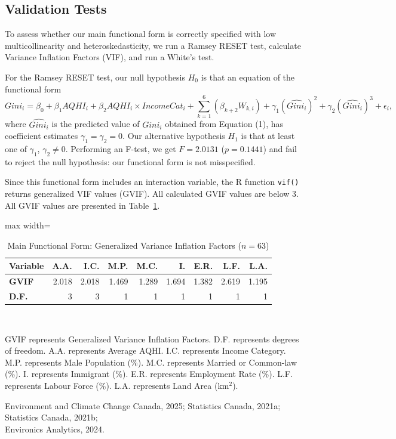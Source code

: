 \documentclass[AEJ]{AEA}
\begin{document}
\subsection{Validation Tests}

To assess whether our main functional form is correctly specified with low multicollinearity
and heteroskedasticity, we run a Ramsey RESET test, calculate Variance Inflation Factors (VIF), 
and run a White's test.

For the Ramsey RESET test, our null hypothesis $H_0$ is that an equation of
the functional form
\begin{equation}
Gini_i=\beta_0+\beta_1 AQHI_i+\beta_2 AQHI_i \times IncomeCat_i
+\sum_{k=1}^{6} \left( \beta_{k+2} W_{k,i} \right) 
+ \gamma_1 (\widehat{Gini_i})^2 + \gamma_2 (\widehat{Gini_i})^3
+ \epsilon_i \text{,}
\end{equation}
where $\widehat{Gini_i}$ is the predicted value of $Gini_i$ obtained from Equation (1),
has coefficient estimates $\gamma_1 = \gamma_2 = 0$. Our alternative hypothesis $H_1$ is that
at least one of $\gamma_1$, $\gamma_2 \neq 0$. Performing an F-test, we get $F=2.0131$
($p = 0.1441$) and fail to reject the null hypothesis: our functional form is not misspecified.

Since this functional form includes an interaction variable, the R function \verb|vif()| returns
generalized VIF values (GVIF). All calculated GVIF values are below 3. All GVIF values are 
presented in Table~\ref{tab:vif}.

\begin{table}[htbp]\centering
\caption{Main Functional Form: Generalized Variance Inflation Factors ($n = 63$)}
\label{tab:vif}
\begin{adjustbox}{max width=\textwidth}
\begin{tabular}{lrrrrrrrr}
\toprule
\textbf{Variable} & \textbf{A.A.} & \textbf{I.C.} & \textbf{M.P.} & 
\textbf{M.C.} & \textbf{I.} & \textbf{E.R.} &
\textbf{L.F.} & \textbf{L.A.}\\
\midrule
\textbf{GVIF} & 2.018 & 2.018 & 1.469 & 1.289 & 1.694 & 1.382 & 2.619 & 1.195 \\
\textbf{D.F.} & 3 & 3 & 1 & 1 & 1 & 1 & 1 & 1 \\
\bottomrule
\end{tabular}
\end{adjustbox}
\\[1ex]
\begin{tablenotes}
GVIF represents Generalized Variance Inflation Factors. D.F. represents degrees
of freedom. A.A. represents Average AQHI. I.C. represents Income Category. 
M.P. represents Male Population (\%). M.C. represents Married or Common-law (\%).  I. represents Immigrant (\%).
E.R. represents Employment Rate (\%). L.F. represents Labour Force (\%). L.A. represents Land Area (km$^2$).
\end{tablenotes}
\begin{tablenotes}[Source]
Environment and Climate Change Canada, 2025; Statistics Canada, 2021a;
Statistics Canada, 2021b; \\Environics Analytics, 2024.
\end{tablenotes}
\end{table}
\end{document}
